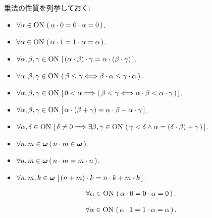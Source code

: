 	乗法の性質を列挙しておく:
	\begin{itemize}
		\item $\forall \alpha \in \mathrm{ON}\, \left(\, \alpha \cdot 0 = 0 \cdot \alpha = 0\, \right)$.
		\item $\forall \alpha \in \mathrm{ON}\, \left(\, \alpha \cdot 1 = 1 \cdot \alpha = \alpha\, \right)$.
		\item $\forall \alpha,\beta,\gamma \in \mathrm{ON}\, \left[\, (\alpha \cdot \beta) \cdot \gamma = \alpha \cdot (\beta \cdot \gamma)\, \right]$.
		\item $\forall \alpha,\beta,\gamma \in \mathrm{ON}\, \left(\, 
			\beta \leq \gamma \Longleftrightarrow \beta \cdot \alpha \leq \gamma \cdot \alpha\, \right)$.
		\item $\forall \alpha,\beta,\gamma \in \mathrm{ON}\, \left[\, 0 < \alpha \Longrightarrow 
			\left(\, \beta < \gamma \Longleftrightarrow \alpha \cdot \beta < \alpha \cdot \gamma\, \right)\, \right]$.
		\item $\forall \alpha,\beta,\gamma \in \mathrm{ON}\, \left[\, 
			\alpha \cdot (\beta + \gamma) = \alpha \cdot \beta + \alpha \cdot \gamma\, \right]$.
		\item $\forall \alpha,\delta \in \mathrm{ON}\, \left[\, \delta \neq 0 
			\Longrightarrow \exists \beta, \gamma \in \mathrm{ON}\, 
			\left(\, \gamma < \delta \wedge \alpha = (\delta \cdot \beta) + \gamma\, \right)\, \right]$.
		\item $\forall n, m \in {\boldsymbol \omega}\, (\, n \cdot m \in {\boldsymbol \omega}\, )$.
		\item $\forall n, m \in {\boldsymbol \omega}\, (\, n \cdot m = m \cdot n\, )$.
		\item $\forall n,m,k \in {\boldsymbol \omega}\, \left[\, (n + m) \cdot k = n \cdot k + m \cdot k\, \right]$.
	\end{itemize}
	
	\begin{screen}
		\begin{thm}[$0$を掛けたら$0$]
			\begin{align}
				\forall \alpha \in \mathrm{ON}\, \left(\, \alpha \cdot 0 = 0 \cdot \alpha = 0\, \right).
			\end{align}
		\end{thm}
	\end{screen}
	
	\begin{screen}
		\begin{thm}[$1$を掛けても変わらない]
			\begin{align}
				\forall \alpha \in \mathrm{ON}\, \left(\, \alpha \cdot 1 = 1 \cdot \alpha = \alpha\, \right).
			\end{align}
		\end{thm}
	\end{screen}
	
